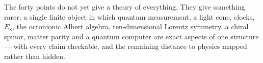 \begin{keyidea}
The forty points do not yet give a theory of everything. They give something rarer: a
single finite object in which quantum measurement, a light cone, clocks, $E_8$, the
octonionic Albert algebra, ten-dimensional Lorentz symmetry, a chiral spinor, matter parity
and a quantum computer are exact aspects of one structure --- with every claim checkable,
and the remaining distance to physics mapped rather than hidden.
\end{keyidea}
